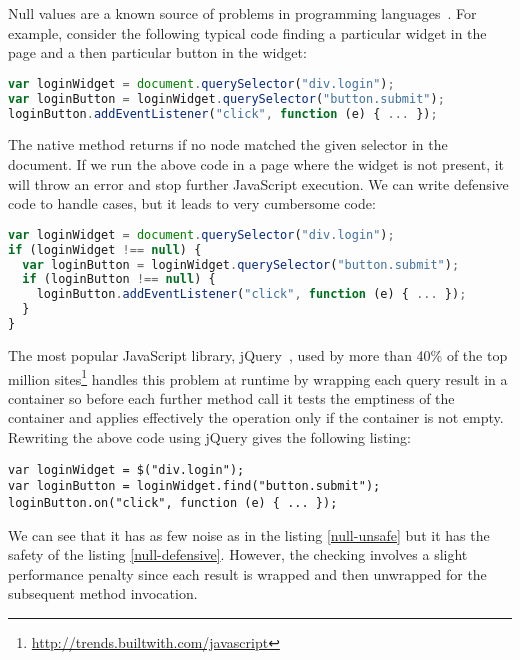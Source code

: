 \documentclass[american,english,runningheads]{llncs}
\begin{document}
Null values are a known source of problems in programming languages~\cite{Hoare09_Null,Nanda09_Null}. For example, consider the following typical code finding a particular widget in the page and a then particular button in the widget:

\begin{lstlisting}[language=JavaScript,label=null-unsafe,caption=Unsafe code]
var loginWidget = document.querySelector("div.login");
var loginButton = loginWidget.querySelector("button.submit");
loginButton.addEventListener("click", function (e) { ... });
\end{lstlisting}

The native  method returns  if no node matched the given selector in the document. If we run the above code in a page where the widget is not present, it will throw an error and stop further JavaScript execution. We can write defensive code to handle  cases, but it leads to very cumbersome code:

\begin{lstlisting}[language=JavaScript,label=null-defensive,caption=Defensive programming to handle null references]
var loginWidget = document.querySelector("div.login");
if (loginWidget !== null) {
  var loginButton = loginWidget.querySelector("button.submit");
  if (loginButton !== null) {
    loginButton.addEventListener("click", function (e) { ... });
  }
}
\end{lstlisting}

The most popular JavaScript library, jQuery~\cite{Bibeault08_jQuery}, used by more than 40\% of the top million sites\footnote{\href{http://trends.builtwith.com/javascript}{http://trends.builtwith.com/javascript}} handles this problem at runtime by wrapping each query result in a container so before each further method call it tests the emptiness of the container and applies effectively the operation only if the container is not empty. Rewriting the above code using jQuery gives the following listing:

\begin{lstlisting}
var loginWidget = $("div.login");
var loginButton = loginWidget.find("button.submit");
loginButton.on("click", function (e) { ... });
\end{lstlisting}

We can see that it has as few noise as in the listing \ref{null-unsafe} but it has the safety of the listing \ref{null-defensive}. However, the checking involves a slight performance penalty since each result is wrapped and then unwrapped for the subsequent method invocation.
\end{document}
